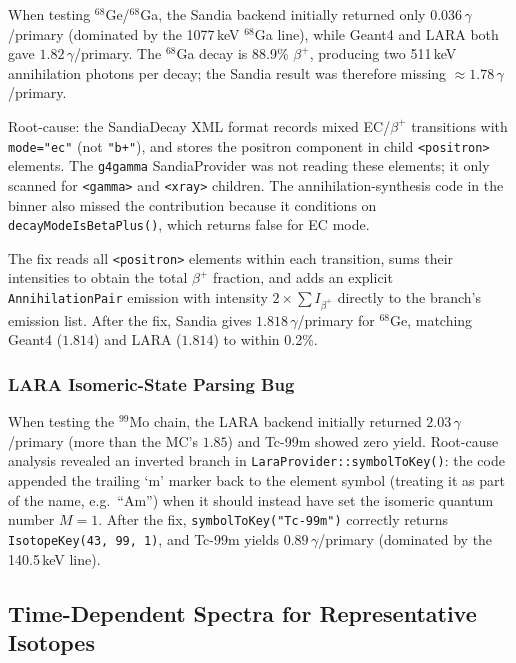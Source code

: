 \documentclass[journal]{IEEEtran}
\begin{document}
When testing $^{68}$Ge/$^{68}$Ga, the Sandia backend initially returned
only $0.036\,\gamma$/primary (dominated by the 1077\,keV $^{68}$Ga line),
while Geant4 and LARA both gave $1.82\,\gamma$/primary.
The $^{68}$Ga decay is 88.9\% $\beta^+$, producing two 511\,keV annihilation
photons per decay; the Sandia result was therefore missing $\approx 1.78\,\gamma$/primary.

Root-cause: the SandiaDecay XML format records mixed EC/$\beta^+$ transitions
with \texttt{mode="ec"} (not \texttt{"b+"}), and stores the positron component
in child \texttt{<positron>} elements.
The \texttt{g4gamma} SandiaProvider was not reading these elements; it only
scanned for \texttt{<gamma>} and \texttt{<xray>} children.
The annihilation-synthesis code in the binner also missed the contribution because
it conditions on \texttt{decayModeIsBetaPlus()}, which returns false for EC mode.

The fix reads all \texttt{<positron>} elements within each transition, sums their
intensities to obtain the total $\beta^+$ fraction, and adds an explicit
\texttt{AnnihilationPair} emission with intensity $2\times\sum I_{\beta^+}$
directly to the branch's emission list.
After the fix, Sandia gives $1.818\,\gamma$/primary for $^{68}$Ge, matching
Geant4 ($1.814$) and LARA ($1.814$) to within 0.2\%.

\subsubsection{LARA Isomeric-State Parsing Bug}
\label{sec:lara_bug}

When testing the $^{99}$Mo chain, the LARA backend initially returned
$2.03\,\gamma$/primary (more than the MC's $1.85$) and Tc-99m showed zero yield.
Root-cause analysis revealed an inverted branch in \texttt{LaraProvider::symbolToKey()}:
the code appended the trailing `m' marker back to the element symbol (treating it
as part of the name, e.g.\ ``Am'') when it should instead have set the isomeric
quantum number $M = 1$.
After the fix, \texttt{symbolToKey("Tc-99m")} correctly returns
\texttt{IsotopeKey(43,\,99,\,1)}, and Tc-99m yields $0.89\,\gamma$/primary
(dominated by the 140.5\,keV line).

\subsection{Time-Dependent Spectra for Representative Isotopes}
\end{document}
